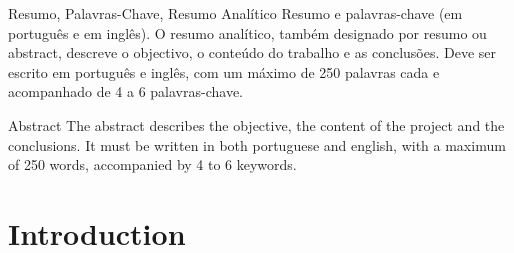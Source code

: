 \documentclass[english]{ist-thesis}
\begin{document}
\makecover

\begin{dedication}
	\lipsum[1] %
\end{dedication}

\begin{acknowledgements}
	\lipsum[2] %
\end{acknowledgements}

\begin{tabstract}{Resumo, Palavras-Chave, Resumo Analítico}
	Resumo e palavras-chave (em português e em inglês). O resumo analítico, também designado por resumo ou abstract, descreve o objectivo, o conteúdo do trabalho e as conclusões. Deve ser escrito em português e inglês, com um máximo de 250 palavras cada e acompanhado de 4 a 6 palavras-chave.
\end{tabstract}

\begin{fabstract}{Abstract}
	The abstract describes the objective, the content of the project and the conclusions. It must be written in both portuguese and english, with a maximum of 250 words, accompanied by 4 to 6 keywords.
\end{fabstract}

\tableofcontents

\listoffigures

\listoftables

\printunsrtglossary[style = long, nogroupskip]
\printunsrtglossary[type = abbreviations, style = long, nogroupskip, title = {Lista de Acrónimos}]
\printunsrtglossary[type = symbols, nogroupskip, title = {Lista de Símbolos}]

\mainstart

\chapter{Introduction}
\end{document}
